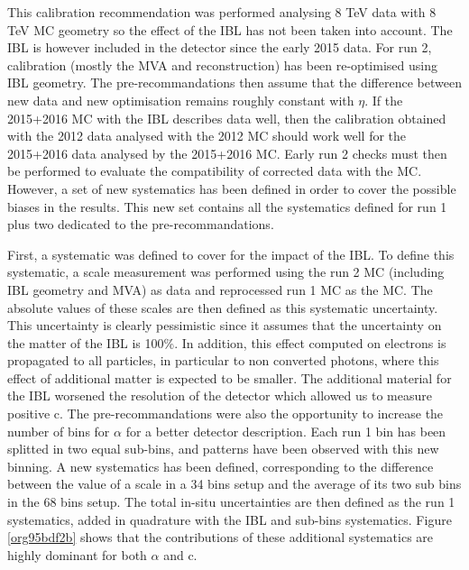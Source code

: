 This calibration recommendation was performed analysing 8 TeV data with 8 TeV MC geometry so the effect of the IBL has not been taken into account.
The IBL is however included in the detector since the early 2015 data.
For run 2, calibration (mostly the MVA and reconstruction) has been re-optimised using IBL geometry.
The pre-recommandations then assume that the difference between new data and new optimisation remains roughly constant with $\eta$.
If the 2015+2016 MC with the IBL describes data well, then the calibration obtained with the 2012 data analysed with the 2012 MC should work well for the 2015+2016 data analysed by the 2015+2016 MC.
Early run 2 checks must then be performed to evaluate the compatibility of corrected data with the MC.
However, a set of new systematics has been defined in order to cover the possible biases in the results.
This new set contains all the systematics defined for run 1 plus two dedicated to the pre-recommandations.

First, a systematic was defined to cover for the impact of the IBL.
To define this systematic, a scale measurement was performed using the run 2 MC (including IBL geometry and MVA) as data and reprocessed run 1 MC as the MC.
The absolute values of these scales are then defined as this systematic uncertainty.
This uncertainty is clearly pessimistic since it assumes that the uncertainty on the matter of the IBL is 100\%.
In addition, this effect computed on electrons is propagated to all particles, in particular to non converted photons, where this effect of additional matter is expected to be smaller.
The additional material for the IBL worsened the resolution of the detector which allowed us to measure positive c.
The pre-recommandations were also the opportunity to increase the number of bins for \(\alpha\) for a better detector description.
Each run 1 bin has been splitted in two equal sub-bins, and patterns have been observed with this new binning.
A new systematics has been defined, corresponding to the difference between the value of a scale in a 34 bins setup and the average of its two sub bins in the 68 bins setup.
The total in-situ uncertainties are then defined as the run 1 systematics, added in quadrature with the IBL and sub-bins systematics.
Figure \ref{org95bdf2b} shows that the contributions of these additional systematics are highly dominant for both \(\alpha\) and c.

